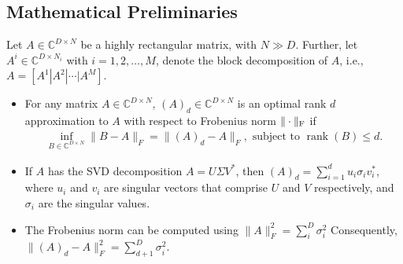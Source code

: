 \documentclass[a0,landscape]{a0poster}
\DeclareMathOperator{\rank}{rank}
\begin{document}
\begin{multicols}{4}
\begin{center}
\end{center}


\subsection*{Mathematical Preliminaries}
Let $A \in \mathbb{C}^{D \times N}$ be a highly rectangular matrix,
with $N \gg D$.  Further, let $A^i \in \mathbb{C}^{D\times N_i}$ with
$i=1,2,\ldots,M$, denote the block decomposition of $A$, i.e.,
$A=\left[A^1|A^2|\cdots|A^M\right]$.

\begin{itemize}[noitemsep]
\item For any matrix $A \in \mathbb{C}^{D \times N}$, $(A)_d\in
  \mathbb{C}^{D \times N}$ is an optimal rank $d$ approximation to $A$
  with respect to Frobenius norm $\| \cdot \|_{\rm F}$ if
  \begin{align*}
    \inf_{B\in \mathbb{C}^{D\times N}} \|B-A\|_F = \|(A)_d - A\|_F,
    \text{ subject to } \rank{(B)} \le d.
  \end{align*}

\item If $A$ has the SVD decomposition $A = U\Sigma V^*$, then $(A)_d
= \sum_{i=1}^d u_i \sigma_i v_i^*$, where $u_i$ and $v_i$ are singular
vectors that comprise $U$ and $V$ respectively, and $\sigma_i$ are
the singular values.

\item The Frobenius norm can be computed using $ \|A\|^2_F = \sum_i^D
  \sigma_i^2$ Consequently, $ \|(A)_d - A \|^2_F = \sum_{d+1}^D
  \sigma_i^2$.
  

\end{itemize}
\end{multicols}
\end{document}
